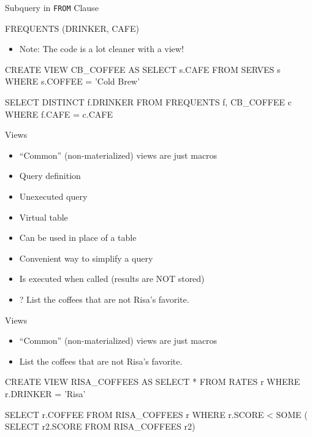 \documentclass[aspectratio=169]{beamer}
\newenvironment{noindentitemize}
{ \begin{itemize}
 \setlength{\itemsep}{1.5ex}
  \setlength{\parsep}{0pt}   
  \setlength{\parskip}{0pt}
 \addtolength{\leftskip}{-2em}
 }
{ \end{itemize} }
\begin{document}
\begin{frame}[fragile]{Subquery in \texttt{FROM} Clause}

FREQUENTS (DRINKER, CAFE)

\begin{noindentitemize}
\item Note: The code is a lot cleaner with a view!
\end{noindentitemize}

\begin{SQL}
CREATE VIEW CB_COFFEE AS
SELECT s.CAFE FROM SERVES s 			
    WHERE s.COFFEE = 'Cold Brew'
\end{SQL}

\begin{SQL}
SELECT DISTINCT f.DRINKER
FROM FREQUENTS f, CB_COFFEE c
WHERE f.CAFE = c.CAFE
\end{SQL}
\end{frame}

\begin{frame}[fragile]{Views}

\begin{noindentitemize}
\item ``Common'' (non-materialized) views are just macros
\item Query definition
\item Unexecuted query 
\item Virtual table
\item Can be used in place of a table
\item Convenient way to simplify a query
\item Is executed when called (results are NOT stored)

\item[?] List the coffees that are not Risa's favorite.
\end{noindentitemize}

\end{frame}

\begin{frame}[fragile]{Views}

\begin{noindentitemize}
\item ``Common'' (non-materialized) views are just macros
\item List the coffees that are not Risa's favorite.
\end{noindentitemize}

\begin{SQL}
CREATE VIEW RISA_COFFEES AS
SELECT * 
FROM RATES r
WHERE r.DRINKER = 'Risa'
\end{SQL}

\begin{SQL}
SELECT r.COFFEE
FROM RISA_COFFEES r
WHERE r.SCORE < SOME (
  SELECT r2.SCORE
  FROM RISA_COFFEES r2)
\end{SQL}
\end{frame}
\end{document}
